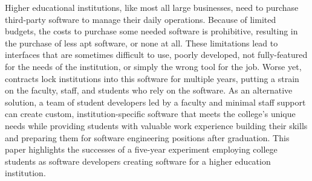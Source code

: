 Higher educational institutions, like most all large businesses, need to purchase third-party software to manage their daily operations. Because of limited budgets, the costs to purchase some needed software is prohibitive, resulting in the purchase of less apt software, or none at all. These limitations lead to interfaces that are sometimes difficult to use, poorly developed, not fully-featured for the needs of the institution, or simply the wrong tool for the job. Worse yet, contracts lock institutions into this software for multiple years, putting a strain on the faculty, staff, and students who rely on the software. As an alternative solution, a team of student developers led by a faculty and minimal staff support can create custom, institution-specific software that meets the college's unique needs while providing students with valuable work experience building their skills and preparing them for software engineering positions after graduation. This paper highlights the successes of a five-year experiment employing college students as software developers creating software for a higher education institution.


